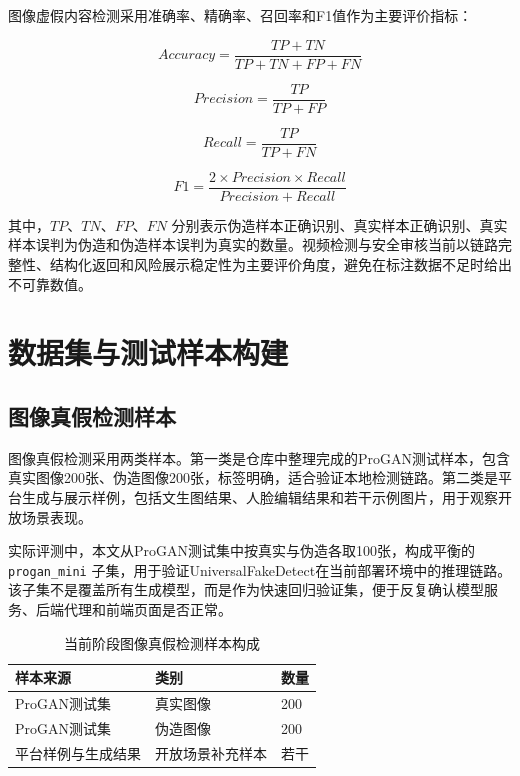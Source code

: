 图像虚假内容检测采用准确率、精确率、召回率和F1值作为主要评价指标：

\begin{equation}
Accuracy = \frac{TP + TN}{TP + TN + FP + FN}
\end{equation}

\begin{equation}
Precision = \frac{TP}{TP + FP}
\end{equation}

\begin{equation}
Recall = \frac{TP}{TP + FN}
\end{equation}

\begin{equation}
F1 = \frac{2 \times Precision \times Recall}{Precision + Recall}
\end{equation}

其中，$TP$、$TN$、$FP$、$FN$ 分别表示伪造样本正确识别、真实样本正确识别、真实样本误判为伪造和伪造样本误判为真实的数量。视频检测与安全审核当前以链路完整性、结构化返回和风险展示稳定性为主要评价角度，避免在标注数据不足时给出不可靠数值。

\section{数据集与测试样本构建}

\subsection{图像真假检测样本}

图像真假检测采用两类样本。第一类是仓库中整理完成的ProGAN测试样本，包含真实图像200张、伪造图像200张，标签明确，适合验证本地检测链路。第二类是平台生成与展示样例，包括文生图结果、人脸编辑结果和若干示例图片，用于观察开放场景表现。

实际评测中，本文从ProGAN测试集中按真实与伪造各取100张，构成平衡的 \texttt{progan\_mini} 子集，用于验证UniversalFakeDetect在当前部署环境中的推理链路。该子集不是覆盖所有生成模型，而是作为快速回归验证集，便于反复确认模型服务、后端代理和前端页面是否正常。

\begin{table}[H]
\centering
\caption{当前阶段图像真假检测样本构成}
\renewcommand{\arraystretch}{1.35}
\songti
\begin{tabular}{C{5.0cm}C{5.0cm}C{2.4cm}}
\toprule
\textbf{样本来源} & \textbf{类别} & \textbf{数量} \\
\midrule
ProGAN测试集 & 真实图像 & 200 \\
ProGAN测试集 & 伪造图像 & 200 \\
平台样例与生成结果 & 开放场景补充样本 & 若干 \\
\bottomrule
\end{tabular}
\end{table}

